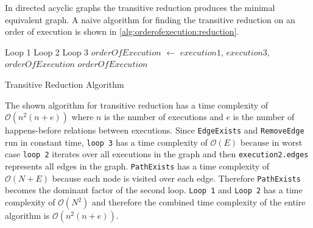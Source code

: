 	\newpar In directed acyclic graphs the transitive reduction produces the minimal equivalent graph. A naive algorithm for finding the transitive reduction on an order of execution is shown in \autoref{alg:orderofexecution:reduction}.
	
	\begin{algorithm}[H]
		\begin{algorithmic}
				\Comment Loop 1
					\Comment Loop 2
							\Comment Loop 3
									\State $orderOfExecution$ $\leftarrow$ \State \hspace{2em} {$execution1$, $execution3$, $orderOfExecution$}
								\EndIf
							\EndFor
						\EndIf
					\EndFor
				\EndFor
			\State
			\Return $orderOfExecution$
			\EndFunction
		\end{algorithmic}
		\caption{Transitive Reduction Algorithm}
		\label{alg:orderofexecution:reduction}
	\end{algorithm}
	
	\newpar The shown algorithm for transitive reduction has a time complexity of $\mathcal{O}(n^2(n+e))$ where $n$ is the number of executions and $e$ is the number of happens-before relations between executions. Since \texttt{EdgeExists} and \texttt{RemoveEdge} run in constant time, \texttt{loop 3} has a time complexity of $\mathcal{O}(E)$ because in worst case \texttt{loop 2} iterates over all executions in the graph and then \texttt{execution2.edges} represents all edges in the graph. \texttt{PathExists} has a time complexity of $\mathcal{O}(N+E)$ because each node is visited over each edge. Therefore \texttt{PathExists} becomes the dominant factor of the second loop. \texttt{Loop 1} and \texttt{Loop 2} has a time complexity of $\mathcal{O}(N^2)$ and therefore the combined time complexity of the entire algorithm is $\mathcal{O}(n^2(n+e))$.
	
